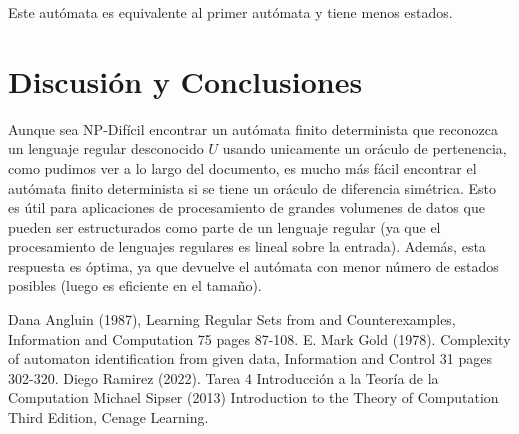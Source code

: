 \documentclass[12pt]{amsart}
\begin{document}

Este autómata es equivalente al primer autómata y tiene menos estados. \\

\section{Discusión y Conclusiones}

Aunque sea NP-Difícil encontrar un autómata finito determinista que reconozca un lenguaje regular desconocido $U$ usando unicamente un oráculo de pertenencia, como pudimos ver a lo largo del documento, es mucho más fácil encontrar el autómata finito determinista si se tiene un oráculo de diferencia simétrica. Esto es útil para aplicaciones de procesamiento de grandes volumenes de datos que pueden ser estructurados como parte de un lenguaje regular (ya que el procesamiento de lenguajes regulares es lineal sobre la entrada). Además, esta respuesta es óptima, ya que devuelve el autómata con menor número de estados posibles (luego es eficiente en el tamaño).


\medskip

\begin{thebibliography}{Widest Entry}
     Dana Angluin (1987), Learning Regular
    Sets from and Counterexamples, Information and Computation 75 pages
    87-108.
     E. Mark Gold (1978). Complexity of automaton
    identification from given data, Information and Control 31 pages
    302-320.
     Diego Ramirez (2022). Tarea 4 Introducción a
    la Teoría de la Computation
     Michael Sipser (2013) Introduction to the Theory of
    Computation Third Edition, Cenage Learning.
\end{thebibliography}
\end{document}
